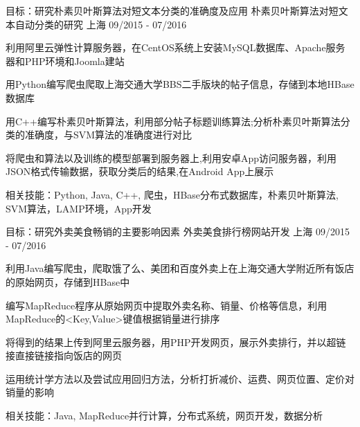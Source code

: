 

\begin{cventries}

  \cventry
    {目标：研究朴素贝叶斯算法对短文本分类的准确度及应用} %
    {朴素贝叶斯算法对短文本自动分类的研究} %
    {上海} %
    {09/2015 - 07/2016} %
    {
      \begin{cvitems} %
        \item {利用阿里云弹性计算服务器，在CentOS系统上安装MySQL数据库、Apache服务器和PHP环境和Joomla建站}
        \item {用Python编写爬虫爬取上海交通大学BBS二手版块的帖子信息，存储到本地HBase数据库}
        \item{用C++编写朴素贝叶斯算法，利用部分帖子标题训练算法;分析朴素贝叶斯算法分类的准确度，与SVM算法的准确度进行对比}
        \item{将爬虫和算法以及训练的模型部署到服务器上,利用安卓App访问服务器，利用JSON格式传输数据，获取分类后的结果,在Android App上展示}
        \item{相关技能：Python, Java, C++, 爬虫，HBase分布式数据库，朴素贝叶斯算法, SVM算法，LAMP环境，App开发}
      \end{cvitems}
    }
  \cventry
    {目标：研究外卖美食畅销的主要影响因素} %
    {外卖美食排行榜网站开发} %
    {上海} %
    {09/2015 - 07/2016} %
    {
      \begin{cvitems} %
        \item {利用Java编写爬虫，爬取饿了么、美团和百度外卖上在上海交通大学附近所有饭店的原始网页，存储到HBase中}
        \item {编写MapReduce程序从原始网页中提取外卖名称、销量、价格等信息，利用MapReduce的<Key,Value>键值根据销量进行排序}
        \item {将得到的结果上传到阿里云服务器，用PHP开发网页，展示外卖排行，并以超链接直接链接指向饭店的网页}
        \item {运用统计学方法以及尝试应用回归方法，分析打折减价、运费、网页位置、定价对销量的影响}
        \item {相关技能：Java, MapReduce并行计算，分布式系统，网页开发，数据分析}
      \end{cvitems}
    }


\end{cventries}
